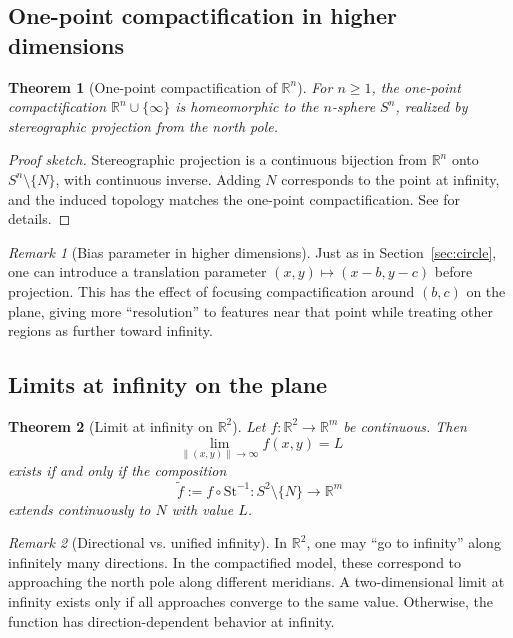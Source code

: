 \documentclass[12pt]{article}
\newtheorem{theorem}{Theorem}
\theoremstyle{remark}
\newtheorem*{remark}{Remark}
\begin{document}
\subsection{One-point compactification in higher dimensions}

\begin{theorem}[One-point compactification of $\mathbb{R}^n$]\label{thm:onepoint}
For $n\geq 1$, the one-point compactification $\mathbb{R}^n\cup\{\infty\}$ is 
homeomorphic to the $n$-sphere $S^n$, realized by stereographic projection from 
the north pole.
\end{theorem}

\begin{proof}[Proof sketch]
Stereographic projection is a continuous bijection from $\mathbb{R}^n$ onto 
$S^n\setminus\{N\}$, with continuous inverse. Adding $N$ corresponds to the 
point at infinity, and the induced topology matches the one-point 
compactification. See \citet{munkres2000topology} for details.
\end{proof}

\begin{remark}[Bias parameter in higher dimensions]
Just as in Section~\ref{sec:circle}, one can introduce a translation parameter 
$(x,y)\mapsto(x-b,y-c)$ before projection. This has the effect of focusing 
compactification around $(b,c)$ on the plane, giving more “resolution” to features 
near that point while treating other regions as further toward infinity.  
\end{remark}

\subsection{Limits at infinity on the plane}

\begin{theorem}[Limit at infinity on $\mathbb{R}^2$]\label{thm:R2limit}
Let $f:\mathbb{R}^2\to\mathbb{R}^m$ be continuous. Then 
\[
\lim_{\|(x,y)\|\to\infty} f(x,y)=L
\]
exists if and only if the composition
\[
\tilde f := f\circ \mathrm{St}^{-1}: S^2\setminus\{N\}\to \mathbb{R}^m
\]
extends continuously to $N$ with value $L$.
\end{theorem}

\begin{remark}[Directional vs. unified infinity]
In $\mathbb{R}^2$, one may “go to infinity” along infinitely many directions. 
In the compactified model, these correspond to approaching the north pole along 
different meridians. A two-dimensional limit at infinity exists only if all 
approaches converge to the same value. Otherwise, the function has 
direction-dependent behavior at infinity.
\end{remark}
\end{document}
